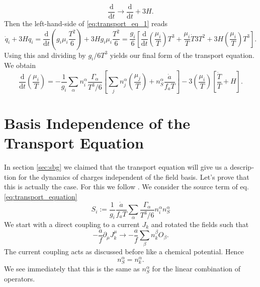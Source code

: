 \documentclass[master,       %
               twoside,        %
               BCOR10mm,       %
               english,ngerman, %
               ]{GAUBM}
\begin{document}
\begin{otherlanguage}{english}
\begin{equation}
	\frac{\mathrm{d}}{\mathrm{d} t} \to \frac{\mathrm{d}}{\mathrm{d} t} + 3 H.
\end{equation}
Then the left-hand-side of \eqref{eq:transport_eq_1} reads
\begin{equation}
	\dot{q}_i + 3 H q_i = \frac{\mathrm{d}}{\mathrm{d} t} \left( g_i \mu_i \frac{T^2}{6} \right) + 3 H g_i \mu_i \frac{T^2}{6} = \frac{g_i}{6} \left[ \frac{\mathrm{d}}{\mathrm{d} t} \left( \frac{\mu_i}{T} \right) T^3 + \frac{\mu_i}{T} \dot{T} 3 T^2 + 3 H \left( \frac{\mu_i}{T} \right) T^3 \right].
\end{equation}
Using this and dividing by $g_i / 6 T^3$ yields our final form of the transport equation. We obtain
\begin{equation}
	\label{eq:transport_equation}
	\boxed{
	\frac{\mathrm{d}}{\mathrm{d} t} \left( \frac{\mu_i}{T} \right) = - \frac{1}{g_i} \sum_\alpha n^\alpha_i \frac{\Gamma_\alpha}{T^3 / 6} \left[ \sum_j n_j^\alpha \left( \frac{\mu_j}{T} \right) + n_S^\alpha \frac{\dot{a}}{f_a T} \right] - 3 \left( \frac{\mu_i}{T} \right) \left[ \frac{\dot{T}}{T} + H \right].
	}
\end{equation}

\section{Basis Independence of the Transport Equation}

In section \ref{sec:sbg} we claimed that the transport equation will give us a description for the dynamics of charges independent of the field basis.
Let's prove that this is actually the case.
For this we follow \cite[sec. 2.2 ]{Domcke:2020kcp_Generic_Couplings}.
We consider the source term of eq. \eqref{eq:transport_equation}
\begin{equation}
	S_i := \frac{1}{g_i} \frac{\dot{a}}{f_a T} \sum_\alpha \frac{\Gamma_\alpha}{T^3 / 6} n_i^\alpha n_S^\alpha
\end{equation}
We start with a direct coupling to a current $J_k$ and rotated the fields such that
\begin{equation}
	- \frac{a}{f} \partial_\mu J^\mu_k \to - \frac{a}{f} \sum_\beta n_k^\beta O_\beta.
\end{equation}
The current coupling acts as discussed before like a chemical potential. Hence
\begin{equation}
	n_S^\alpha = n_k^\alpha.
\end{equation}
We see immediately that this is the same as $n_S^\alpha$ for the linear combination of operators.



\end{otherlanguage}
\end{document}
